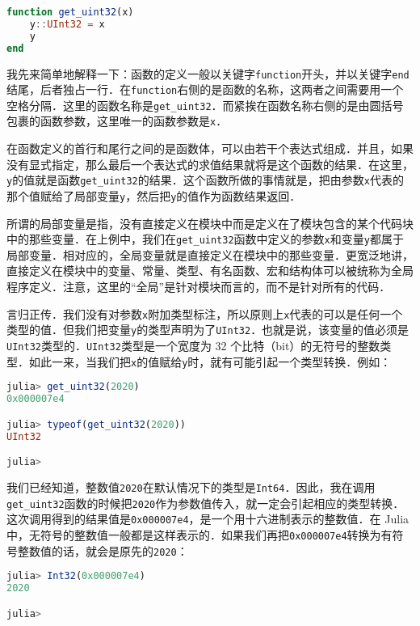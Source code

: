 \begin{lstlisting}[language=julia]
function get_uint32(x)
    y::UInt32 = x
    y
end
\end{lstlisting}

我先来简单地解释一下：函数的定义一般以关键字\verb|function|开头，并以关键字\verb|end|结尾，后者独占一行．在\verb|function|右侧的是函数的名称，这两者之间需要用一个空格分隔．这里的函数名称是\verb|get_uint32|．而紧挨在函数名称右侧的是由圆括号包裹的函数参数，这里唯一的函数参数是\verb|x|．

在函数定义的首行和尾行之间的是函数体，可以由若干个表达式组成．并且，如果没有显式指定，那么最后一个表达式的求值结果就将是这个函数的结果．在这里，\verb|y|的值就是函数\verb|get_uint32|的结果．这个函数所做的事情就是，把由参数\verb|x|代表的那个值赋给了局部变量\verb|y|，然后把\verb|y|的值作为函数结果返回．

所谓的局部变量是指，没有直接定义在模块中而是定义在了模块包含的某个代码块中的那些变量．在上例中，我们在\verb|get_uint32|函数中定义的参数\verb|x|和变量\verb|y|都属于局部变量．相对应的，全局变量就是直接定义在模块中的那些变量．更宽泛地讲，直接定义在模块中的变量、常量、类型、有名函数、宏和结构体可以被统称为全局程序定义．注意，这里的“全局”是针对模块而言的，而不是针对所有的代码．

言归正传．我们没有对参数\verb|x|附加类型标注，所以原则上\verb|x|代表的可以是任何一个类型的值．但我们把变量\verb|y|的类型声明为了\verb|UInt32|．也就是说，该变量的值必须是\verb|UInt32|类型的．\verb|UInt32|类型是一个宽度为 32 个比特（bit）的无符号的整数类型．如此一来，当我们把\verb|x|的值赋给\verb|y|时，就有可能引起一个类型转换．例如：

\begin{lstlisting}[language=julia]
julia> get_uint32(2020)
0x000007e4

julia> typeof(get_uint32(2020))
UInt32

julia> 
\end{lstlisting}

我们已经知道，整数值\verb|2020|在默认情况下的类型是\verb|Int64|．因此，我在调用\verb|get_uint32|函数的时候把\verb|2020|作为参数值传入，就一定会引起相应的类型转换．这次调用得到的结果值是\verb|0x000007e4|，是一个用十六进制表示的整数值．在 Julia 中，无符号的整数值一般都是这样表示的．如果我们再把\verb|0x000007e4|转换为有符号整数值的话，就会是原先的\verb|2020|：

\begin{lstlisting}[language=julia]
julia> Int32(0x000007e4)
2020

julia> 
\end{lstlisting}

